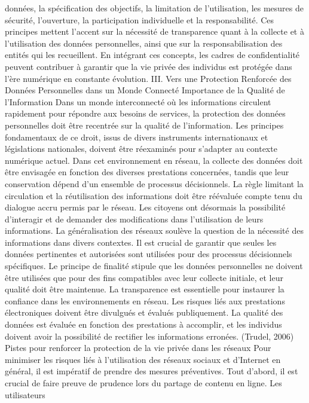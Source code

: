 \documentclass[
]{article}
\begin{document}
données, la spécification des objectifs, la limitation de l'utilisation,
les mesures de sécurité, l'ouverture, la participation individuelle et
la responsabilité. Ces principes mettent l'accent sur la nécessité de
transparence quant à la collecte et à l'utilisation des données
personnelles, ainsi que sur la responsabilisation des entités qui les
recueillent. En intégrant ces concepts, les cadres de confidentialité
peuvent contribuer à garantir que la vie privée des individus est
protégée dans l'ère numérique en constante évolution. III. Vers une
Protection Renforcée des Données Personnelles dans un Monde Connecté
Importance de la Qualité de l'Information Dans un monde interconnecté où
les informations circulent rapidement pour répondre aux besoins de
services, la protection des données personnelles doit être recentrée sur
la qualité de l'information. Les principes fondamentaux de ce droit,
issus de divers instruments internationaux et législations nationales,
doivent être réexaminés pour s'adapter au contexte numérique actuel.
Dans cet environnement en réseau, la collecte des données doit être
envisagée en fonction des diverses prestations concernées, tandis que
leur conservation dépend d'un ensemble de processus décisionnels. La
règle limitant la circulation et la réutilisation des informations doit
être réévaluée compte tenu du dialogue accru permis par le réseau. Les
citoyens ont désormais la possibilité d'interagir et de demander des
modifications dans l'utilisation de leurs informations. La
généralisation des réseaux soulève la question de la nécessité des
informations dans divers contextes. Il est crucial de garantir que
seules les données pertinentes et autorisées sont utilisées pour des
processus décisionnels spécifiques. Le principe de finalité stipule que
les données personnelles ne doivent être utilisées que pour des fins
compatibles avec leur collecte initiale, et leur qualité doit être
maintenue. La transparence est essentielle pour instaurer la confiance
dans les environnements en réseau. Les risques liés aux prestations
électroniques doivent être divulgués et évalués publiquement. La qualité
des données est évaluée en fonction des prestations à accomplir, et les
individus doivent avoir la possibilité de rectifier les informations
erronées. (Trudel, 2006) Pistes pour renforcer la protection de la vie
privée dans les réseaux Pour minimiser les risques liés à l'utilisation
des réseaux sociaux et d'Internet en général, il est impératif de
prendre des mesures préventives. Tout d'abord, il est crucial de faire
preuve de prudence lors du partage de contenu en ligne. Les utilisateurs
\end{document}
